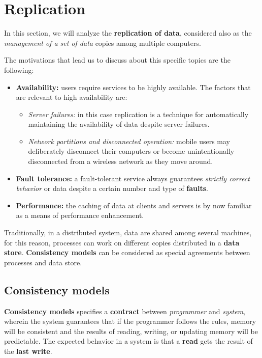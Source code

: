 \chapter{Replication}
In this section, we will analyze the \textbf{replication of data}, considered also as the \textit{management of a set of data} copies among multiple computers.

The motivations that lead us to discuss about this specific topics are the following:
\begin{itemize}
    \item \textbf{Availability:} users require services to be highly available. The factors that are relevant to high availability are:
    \begin{itemize}
        \item \textit{Server failures:} in this case replication is a technique for automatically maintaining the availability of data despite server failures.
        \item \textit{Network partitions and disconnected operation:} mobile users may deliberately disconnect their computers or become unintentionally disconnected from a wireless network as they move around.
    \end{itemize}
    \item \textbf{Fault tolerance:} a fault-tolerant service always guarantees \textit{strictly correct behavior} or data despite a certain number and type of \textbf{faults}.
    \item \textbf{Performance:} the caching of data at clients and servers is by now familiar as a means of performance enhancement.
\end{itemize}

Traditionally, in a distributed system, data are shared among several machines, for this reason, processes can work on different copies distributed in a \textbf{data store}. \textbf{Consistency models} can be considered as special agreements between processes and data store.

\section{Consistency models}
\textbf{Consistency models} specifies a \textbf{contract} between \textit{programmer} and \textit{system}, wherein the system guarantees that if the programmer follows the rules, memory will be consistent and the results of reading, writing, or updating memory will be predictable. The expected behavior in a system is that a \textbf{read} gets the result of the \textbf{last write}.

